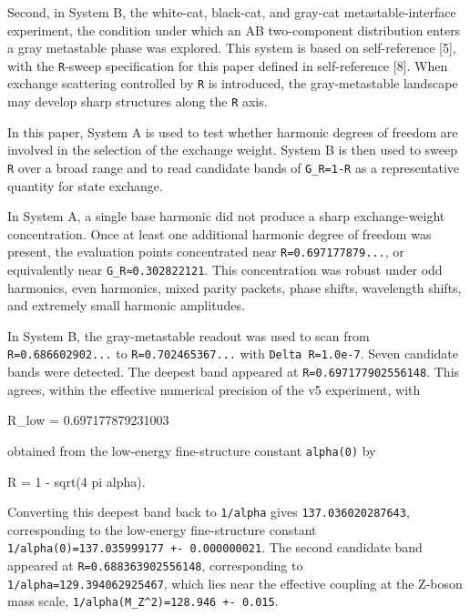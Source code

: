 \documentclass[
]{article}
\newenvironment{Shaded}{}{}
\newcommand{\NormalTok}[1]{#1}
\begin{document}
Second, in System B, the white-cat, black-cat, and gray-cat
metastable-interface experiment, the condition under which an AB
two-component distribution enters a gray metastable phase was explored.
This system is based on self-reference {[}5{]}, with the
\texttt{R}-sweep specification for this paper defined in self-reference
{[}8{]}. When exchange scattering controlled by \texttt{R} is
introduced, the gray-metastable landscape may develop sharp structures
along the \texttt{R} axis.

In this paper, System A is used to test whether harmonic degrees of
freedom are involved in the selection of the exchange weight. System B
is then used to sweep \texttt{R} over a broad range and to read
candidate bands of \texttt{G\_R=1-R} as a representative quantity for
state exchange.

In System A, a single base harmonic did not produce a sharp
exchange-weight concentration. Once at least one additional harmonic
degree of freedom was present, the evaluation points concentrated near
\texttt{R=0.697177879...}, or equivalently near
\texttt{G\_R≈0.302822121}. This concentration was robust under odd
harmonics, even harmonics, mixed parity packets, phase shifts,
wavelength shifts, and extremely small harmonic amplitudes.

In System B, the gray-metastable readout was used to scan from
\texttt{R=0.686602902...} to \texttt{R=0.702465367...} with
\texttt{Delta\ R=1.0e-7}. Seven candidate bands were detected. The
deepest band appeared at \texttt{R=0.697177902556148}. This agrees,
within the effective numerical precision of the v5 experiment, with

\begin{Shaded}
\begin{Highlighting}[]
\NormalTok{R\_low = 0.697177879231003}
\end{Highlighting}
\end{Shaded}

obtained from the low-energy fine-structure constant \texttt{alpha(0)}
by

\begin{Shaded}
\begin{Highlighting}[]
\NormalTok{R = 1 {-} sqrt(4 pi alpha).}
\end{Highlighting}
\end{Shaded}

Converting this deepest band back to \texttt{1/alpha} gives
\texttt{137.036020287643}, corresponding to the low-energy
fine-structure constant
\texttt{1/alpha(0)=137.035999177\ +-\ 0.000000021}. The second candidate
band appeared at \texttt{R=0.688363902556148}, corresponding to
\texttt{1/alpha=129.394062925467}, which lies near the effective
coupling at the Z-boson mass scale,
\texttt{1/alpha(M\_Z\^{}2)=128.946\ +-\ 0.015}.
\end{document}
